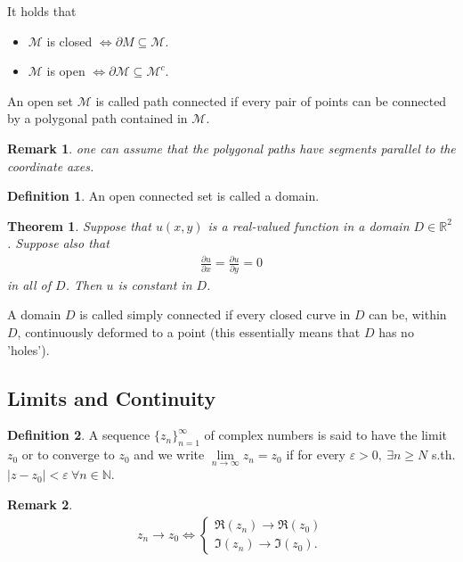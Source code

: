 \documentclass[12pt, a4paper]{article}
\theoremstyle{plain}
\newtheorem{thm}{Theorem} %
\newtheorem{rem}{Remark}
\theoremstyle{definition}
\newtheorem{definition}{Definition} %
\begin{document}
		It holds that
		\begin{itemize}
			\item $\mathcal{M}$ is closed $\iff \partial M \subseteq \mathcal{M}$.
			\item $\mathcal{M}$ is open $\iff \partial \mathcal{M}\subseteq \mathcal{M}^c$.
		\end{itemize}

		An open set $\mathcal{M}$ is called path connected if every pair of points can be connected by a polygonal path contained in $\mathcal{M}$.\\

		\begin{rem}
			one can assume that the polygonal paths have segments parallel to the coordinate axes.\\
		\end{rem}

		\begin{definition}
			An open connected set is called a domain.\\
		\end{definition}

		\begin{thm}
			Suppose that $u(x,y)$ is a real-valued function in a domain $D\in \mathbb{R}^2$. Suppose also that
			\begin{align*}
				\frac{\partial u}{\partial x} = \frac{\partial u}{\partial y} = 0
			\end{align*}
			in all of $D$. Then $u$ is constant in $D$.
		\end{thm}

		A domain $D$ is called simply connected if every closed curve in $D$ can be, within $D$, continuously deformed to a point (this essentially means that $D$ has no 'holes').

		\subsection{Limits and Continuity} %
		\label{sub:limits_and_continuity}
			\begin{definition}
				A sequence $\{z_n\}_{n=1}^{\infty}$ of complex numbers is said to have the limit $z_0$ or to converge to $z_0$ and we write $\lim\limits_{n\to\infty}z_n = z_0$ if for every $\varepsilon>0,\:\exists n\ge N$ s.th. $|z-z_0| < \varepsilon\:\forall n\in \mathbb{N}$.\\
			\end{definition}

			\begin{rem}
				\begin{align*}
					z_n\to z_0 \iff
					\begin{cases}
						\Re(z_n) \to \Re(z_0)\\
						\Im(z_n) \to \Im(z_0).
					\end{cases}\\
				\end{align*}
			\end{rem}
\end{document}
